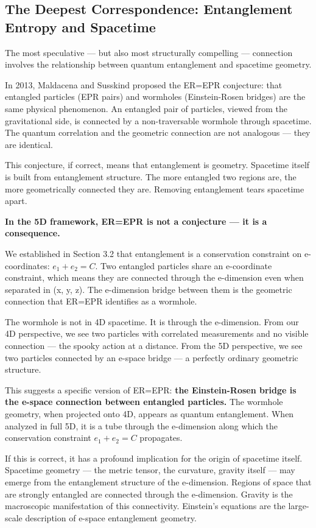 \documentclass[aps,prd,preprint,superscriptaddress,longbibliography,floatfix]{revtex4-2}
\theoremstyle{remark}
\begin{document}
\subsection{The Deepest Correspondence: Entanglement Entropy and Spacetime}

The most speculative --- but also most structurally compelling --- connection involves the relationship between quantum entanglement and spacetime geometry.

In 2013, Maldacena and Susskind proposed the ER=EPR conjecture: that entangled particles (EPR pairs) and wormholes (Einstein-Rosen bridges) are the same physical phenomenon. An entangled pair of particles, viewed from the gravitational side, is connected by a non-traversable wormhole through spacetime. The quantum correlation and the geometric connection are not analogous --- they are identical.

This conjecture, if correct, means that entanglement is geometry. Spacetime itself is built from entanglement structure. The more entangled two regions are, the more geometrically connected they are. Removing entanglement tears spacetime apart.

\textbf{In the 5D framework, ER=EPR is not a conjecture --- it is a consequence.}

We established in Section 3.2 that entanglement is a conservation constraint on e-coordinates: $e_{1} + e_{2} = C$. Two entangled particles share an e-coordinate constraint, which means they are connected through the e-dimension even when separated in (x, y, z). The e-dimension bridge between them is the geometric connection that ER=EPR identifies as a wormhole.

The wormhole is not in 4D spacetime. It is through the e-dimension. From our 4D perspective, we see two particles with correlated measurements and no visible connection --- the spooky action at a distance. From the 5D perspective, we see two particles connected by an e-space bridge --- a perfectly ordinary geometric structure.

This suggests a specific version of ER=EPR: \textbf{the Einstein-Rosen bridge is the e-space connection between entangled particles.} The wormhole geometry, when projected onto 4D, appears as quantum entanglement. When analyzed in full 5D, it is a tube through the e-dimension along which the conservation constraint $e_{1} + e_{2} = C$ propagates.

If this is correct, it has a profound implication for the origin of spacetime itself. Spacetime geometry --- the metric tensor, the curvature, gravity itself --- may emerge from the entanglement structure of the e-dimension. Regions of space that are strongly entangled are connected through the e-dimension. Gravity is the macroscopic manifestation of this connectivity. Einstein's equations are the large-scale description of e-space entanglement geometry.
\end{document}
